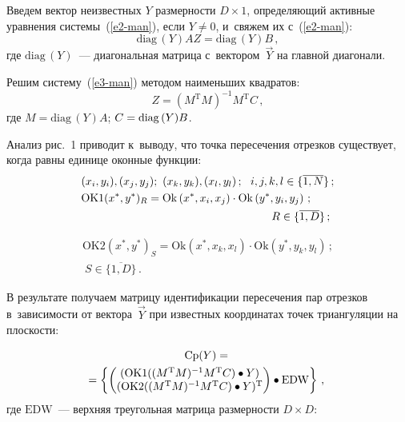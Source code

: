 \begin{multicols}{2}
  Введем вектор неизвестных $Y$ размерности $D\times 1$, опре\-де\-ля\-ющий 
активные урав\-не\-ния сис\-те\-мы~(\ref{e2-man}), если $Y\not= 0$, и~свяжем их 
с~(\ref{e2-man}):
  \begin{equation}
  \mathrm{diag}\,(Y) AZ=\mathrm{diag}\,(Y)B\,,
  \label{e3-man}
  \end{equation}
где $\mathrm{diag}\,(Y)$~--- диагональная мат\-ри\-ца с~вектором~$\vec{Y}$ на 
главной диа\-го\-нали.

  Решим систему~(\ref{e3-man}) методом наименьших квад\-ра\-тов:
  \begin{equation*}
  Z=\left( M^{\mathrm{T}} M\right)^{-1} M^{\mathrm{T}} C\,,
  \end{equation*}
где $M=\mathrm{diag}\,(Y) A$; $C\hm= \mathrm{diag}\,(Y) B$.


      
  Анализ рис.~1 приводит к~выводу, что точка пересечения отрезков 
существует, когда рав\-ны единице оконные функ\-ции:
  \begin{align*}
 & (x_i, y_i), (x_j, y_j); \ (x_k, y_k), (x_l, y_l)\,;\ \ i,j,k,l\in \{\overline{1,N}\}\,;\\
 & \mathrm{OK}1(x^*, y^*)_R =
 \mathrm{Ok}\left(x^*, x_i, x_j\right)\cdot \mathrm{Ok} \left(y^*, y_i, 
y_j\right)\,;\\
 &\hspace*{60mm}R\in\{ \overline{1,D}\}\,;
 \end{align*}
 
 \noindent
 \begin{multline*}
  \mathrm{OK}2\left(x^*, y^*\right)_S= \mathrm{Ok}\left(x^*, x_k, x_l\right)\cdot 
 \mathrm{Ok} (y^*, y_k, y_l)\,;\\
\ S\in \{\overline{1,D}\}\,.
  \end{multline*}
  
  В результате получаем мат\-ри\-цу идентификации пересечения пар отрезков 
в~за\-ви\-си\-мости от вектора~$\vec{Y}$ при известных координатах точек 
триангуляции на плос\-кости:

\noindent
  \begin{multline}
  \mathrm{Cp}(Y)={}\\
 \!\!\hspace*{-2mm} {}=\left\{ \begin{pmatrix}
  (\mathrm{OK}1((M^{\mathrm{T}}M)^{-1}M^{\mathrm{T}}C)\bullet Y)\\
  (\mathrm{OK}2((M^{\mathrm{T}}M)^{-1} M^{\mathrm{T}} C)\bullet Y)^{\mathrm{T}}
  \end{pmatrix}\bullet \mathrm{EDW}\right\}\,,\!\!
  \label{e5-man}
  \end{multline}
где $\mathrm{EDW}$~---  верхняя треугольная мат\-ри\-ца раз\-мер\-ности $D\times D$: 


\end{multicols}
